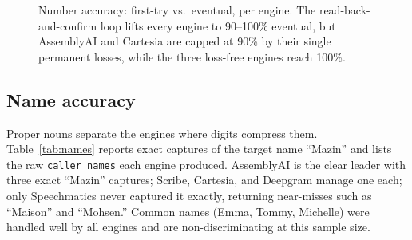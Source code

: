 \documentclass[11pt]{article}
\begin{document}
\begin{figure}[ht]
\centering
{}
\caption{Number accuracy: first-try vs.\ eventual, per engine. The
read-back-and-confirm loop lifts every engine to 90--100\% eventual, but
AssemblyAI and Cartesia are capped at 90\% by their single permanent losses,
while the three loss-free engines reach 100\%.}
\label{fig:numbars}
\end{figure}

\subsection{Name accuracy}
\label{sec:names}

Proper nouns separate the engines where digits compress them.
Table~\ref{tab:names} reports exact captures of the target name ``Mazin'' and
lists the raw \texttt{caller\_names} each engine produced. AssemblyAI is the
clear leader with three exact ``Mazin'' captures; Scribe, Cartesia, and Deepgram
manage one each; only Speechmatics never captured it exactly, returning
near-misses such as ``Maison'' and ``Mohsen.'' Common names
(Emma, Tommy, Michelle) were handled well by all engines and are
non-discriminating at this sample size.
\end{document}
